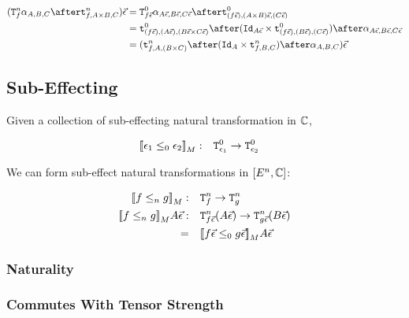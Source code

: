 \documentclass{report}
\begin{document}
\begin{align}
    (\Tn{f}{\alpha_{A, B, C}}\after\tstrengthn{f}{A\times B}{C})\ev & = \Tz{f\ev}{\alpha_{A\ev, B\ev, C\ev}} \after\tstrengthz{(f\ev)}{(A\times B)\ev}{(C\ev)}\\
    & = \tstrengthz{(f\ev)}{(A\ev)}{(B\ev\times C\ev)}\after(\Id{A\ev}\times \tstrengthz{(f\ev)}{(B\ev)}{(C\ev)})\after\alpha_{A\ev, B\ev, C\ev}\\
    & = (\tstrengthn{f}{A}{(B\times C)}\after(\Id{A}\times \tstrengthn{f}{B}{C})\after\alpha_{A, B, C})\ev\\
\end{align}


\subsection{Sub-Effecting}
Given a collection of sub-effecting natural transformation in $\mathbb{C}$,

\begin{align}
    {\bf [\![}\epsilon_1\leq_0 \epsilon_2{\bf ]\!]}_M:&\quad \texttt{T}^0_{\epsilon_1} \rightarrow \texttt{T}^0_{\epsilon_2}
\end{align}

We can form sub-effect natural transformations in $[E^n, \mathbb{C}]$:

\begin{align}
    {\bf [\![}f\leq_n g{\bf ]\!]}_M:&\quad\texttt{T}^n_{f}\rightarrow \texttt{T}^n_{g}\\
    {\bf [\![}f\leq_n g{\bf ]\!]}_M A \vec{\epsilon}:&\quad\texttt{T}^n_{f\vec{\epsilon}}(A\vec{\epsilon})\rightarrow \texttt{T}^n_{g\vec{\epsilon}}(B\vec{\epsilon})\\
    =&\quad {\bf [\![}f\vec{\epsilon}\leq_0 g\vec{\epsilon}{\bf ]\!]}_MA\vec{\epsilon}
\end{align}

\subsubsection{Naturality}


\subsubsection{Commutes With Tensor Strength}
\end{document}
